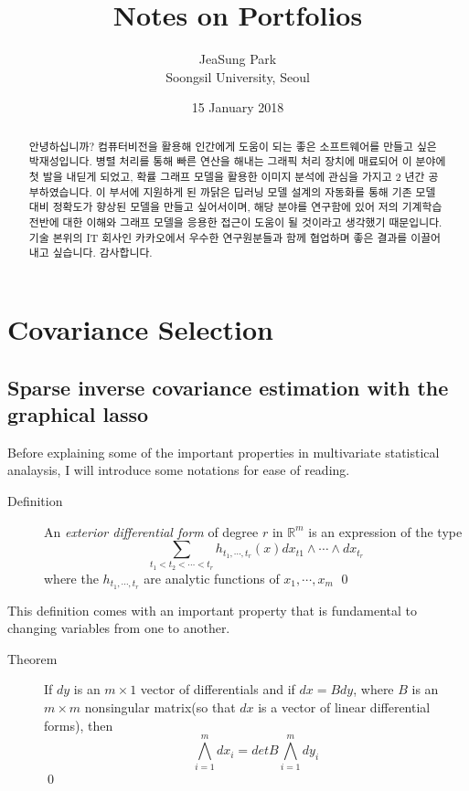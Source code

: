 \documentclass[openany]{memoir}
\newcommand\textkorean[1]{\begin{CJK}{UTF8}{mj}#1\end{CJK}}
\begin{document}
\title{Notes on Portfolios}
\author{JeaSung Park\\
Soongsil University, Seoul}
\date{15 January 2018}
\maketitle

\clearpage
\begin{abstract}
\textkorean{안녕하십니까? 컴퓨터비전을 활용해 인간에게 도움이 되는 좋은 소프트웨어를 만들고 싶은 박재성입니다. 병렬 처리를 통해 빠른 연산을 해내는 그래픽 처리 장치에 매료되어 이 분야에 첫 발을 내딛게 되었고, 확률 그래프 모델을 활용한 이미지 분석에 관심을 가지고 2 년간 공부하였습니다. 이 부서에 지원하게 된 까닭은 딥러닝 모델 설계의 자동화를 통해 기존 모델 대비 정확도가 향상된 모델을 만들고 싶어서이며, 해당 분야를 연구함에 있어 저의 기계학습 전반에 대한 이해와 그래프 모델을 응용한 접근이 도움이 될 것이라고 생각했기 때문입니다. 기술 본위의 IT 회사인 카카오에서 우수한 연구원분들과 함께 협업하며 좋은 결과를 이끌어내고 싶습니다. 감사합니다.}
\end{abstract}

\chapter{Covariance Selection}
\section{Sparse inverse covariance estimation with the graphical lasso}
Before explaining some of the important properties in multivariate statistical analaysis, I will introduce some notations for ease of reading.
\begin{description}
	\item[Definition] An \textit{exterior differential form} of degree $r$ in $\mathbb{R}^{m}$ is an expression of the type
	$$\sum_{t_1 < t_2 < \cdots < t_r} h_{t_1, \cdots, t_r}(x)dx_{t1} \land \cdots \land dx_{t_r}$$
	where the $h_{t_1, \cdots, t_r}$ are analytic functions of $x_1, \cdots, x_m$ \qed
\end{description}

This definition comes with an important property that is fundamental to changing variables from one to another.

\begin{description}
\item[Theorem] If $dy$ is an $m \times 1$ vector of differentials and if $dx=Bdy$, where $B$ is an $m \times m$ nonsingular matrix(so that $dx$ is a vector of linear differential forms), then
$$\bigwedge_{i=1}^{m} dx_i = detB \bigwedge_{i=1}^{m} dy_i$$ \qed
\end{description}
\end{document}
